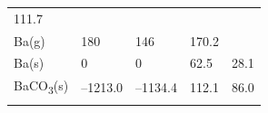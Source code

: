 \documentclass[
  9pt,
]{extbook}
\theoremstyle{definition}
\theoremstyle{definition}
\theoremstyle{definition}
\theoremstyle{remark}
\begin{document}
\begin{longtable}[]{@{}lllll@{}}
\begin{minipage}[t]{0.18\columnwidth}
111.7\strut
\end{minipage}\tabularnewline
\begin{minipage}[t]{0.10\columnwidth}\raggedright
Ba(g)\strut
\end{minipage} & \begin{minipage}[t]{0.19\columnwidth}\raggedright
180\strut
\end{minipage} & \begin{minipage}[t]{0.20\columnwidth}\raggedright
146\strut
\end{minipage} & \begin{minipage}[t]{0.18\columnwidth}\raggedright
170.2\strut
\end{minipage} & \begin{minipage}[t]{0.18\columnwidth}\raggedright
\strut
\end{minipage}\tabularnewline
\begin{minipage}[t]{0.10\columnwidth}\raggedright
Ba(s)\strut
\end{minipage} & \begin{minipage}[t]{0.19\columnwidth}\raggedright
0\strut
\end{minipage} & \begin{minipage}[t]{0.20\columnwidth}\raggedright
0\strut
\end{minipage} & \begin{minipage}[t]{0.18\columnwidth}\raggedright
62.5\strut
\end{minipage} & \begin{minipage}[t]{0.18\columnwidth}\raggedright
28.1\strut
\end{minipage}\tabularnewline
\begin{minipage}[t]{0.10\columnwidth}\raggedright
BaCO\textsubscript{3}(s)\strut
\end{minipage} & \begin{minipage}[t]{0.19\columnwidth}\raggedright
--1213.0\strut
\end{minipage} & \begin{minipage}[t]{0.20\columnwidth}\raggedright
--1134.4\strut
\end{minipage} & \begin{minipage}[t]{0.18\columnwidth}\raggedright
112.1\strut
\end{minipage} & \begin{minipage}[t]{0.18\columnwidth}\raggedright
86.0\strut
\end{minipage}\tabularnewline
\begin{minipage}[t]{0.10\columnwidth}\raggedright

\end{minipage}
\end{longtable}
\end{document}
